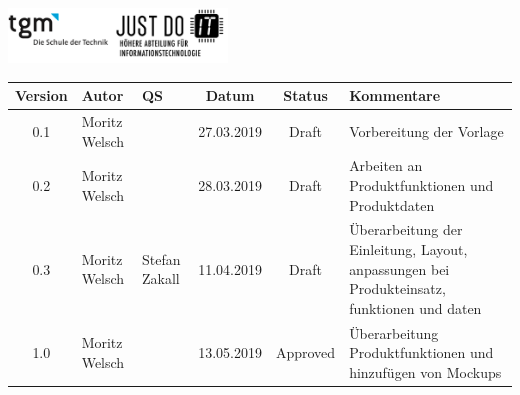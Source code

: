 \documentclass[minted, notitle]{protocol}
\newcommand{\draft}{\cellcolor{Peach} Draft}
\newcommand{\abgabe}{\cellcolor{LimeGreen}Approved }
\begin{document}
\begin{titlepage}
{		%
		{\vspace{0.3cm}\includegraphics[width=220]{images/tgm_full.png}}
	}
\end{titlepage}


\begin{center}
\begin{tabular}{| c | p{1.8cm} | p{1.8cm} | c | c | p{3.4cm} |}
\hline \rowcolor{gray} \textbf{\color{white}Version} & \textbf{\color{white}Autor} & \textbf{\color{white}QS} & \textbf{\color{white}Datum} & \textbf{\color{white}Status} & \textbf{\color{white}Kommentare} \\ 
 \hline \hline
 0.1 & Moritz Welsch && 27.03.2019 & \draft & Vorbereitung der Vorlage\\
 \hline
 0.2 & Moritz Welsch && 28.03.2019 & \draft & Arbeiten an Produktfunktionen und Produktdaten\\
 \hline
 0.3 & Moritz Welsch &Stefan Zakall& 11.04.2019 & \draft & Überarbeitung der Einleitung, Layout, anpassungen bei Produkteinsatz, funktionen und daten \\
 \hline  
 1.0 & Moritz Welsch && 13.05.2019 & \abgabe & Überarbeitung Produktfunktionen und hinzufügen von Mockups\\
 \hline
\end{tabular}
\end{center}

\clearpage
{ %
  \hypersetup{linkcolor=black}
  \tableofcontents
} 

\clearpage

\end{document}
